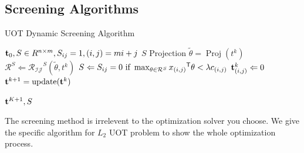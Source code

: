 \subsection{Screening Algorithms}

 \begin{algorithm}
 \caption{UOT Dynamic Screening Algorithm}
 \begin{algorithmic}[h]
 \renewcommand{\algorithmicrequire}{\textbf{Input:}}
 \renewcommand{\algorithmicensure}{\textbf{Output:}}
 \REQUIRE $\mathbf t_0, S \in R^{n\times m}, S_{ij}=1, (i,j) = mi+j$
 \ENSURE  $S$
  \STATE {}
  \STATE $\text{Projection } \tilde{\theta} = \operatorname{Proj}(t^k)$ 
   \STATE $\mathcal{R}^{S} \Leftarrow \mathcal{R_{IJ}}^S{(\tilde{\theta},t^k)}$
      \STATE $S \Leftarrow {S_{ij} = 0 \text{ if } \max_{\theta \in \mathcal{R}^S} {x_{(i,j)}}^{\mathsf T}\theta <\lambda c_{(i,j)} }$
  \ENDFOR
    \ENDFOR
    \STATE $\mathbf t^k_{(i,j)} \Leftarrow 0$
    \ENDFOR
    \STATE $\mathbf t^{k+1} = \operatorname{update}(\mathbf t^k)$
  \ENDFOR
  
 \RETURN $\mathbf t^{K+1}, S $ 
 \end{algorithmic} 
 \end{algorithm}

The screening method is irrelevent to the optimization solver you choose. We give the specific algorithm for $L_2$ UOT problem to show the whole optimization process.\\











































